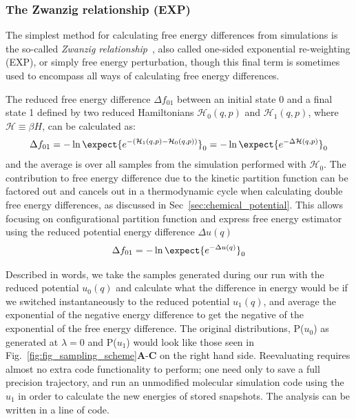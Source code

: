 \subsubsection{The Zwanzig relationship (EXP)}
The simplest method for calculating free energy differences from simulations is the so-called \textit{Zwanzig
relationship}~\cite{zwanzig1954hightemperature}, also called one-sided exponential re-weighting (EXP), or simply free energy perturbation, though this final term is sometimes used to encompass all ways of calculating free energy differences.

The reduced free energy difference $\Delta f_{01}$ between an initial state 0 and a final state 1 defined by two reduced Hamiltonians $\mathcal{H}_0(q,p)$ and $\mathcal{H}_1(q,p)$, where $\mathcal{H} \equiv \beta H$, can be calculated as:
\begin{eqnarray}
\Delta f_{01}  =  -\ln \expect{e^{- (\mathcal{H}_1(q,p) - \mathcal{H}_0(q,p))}}_0 =  -\ln \expect{e^{- \Delta \mathcal{H}(q,p)} }_0
\end{eqnarray}
and the average is over all samples from the simulation performed with $\mathcal{H}_0$.
The contribution to free energy difference due to the kinetic partition function can be factored out and cancels out in a thermodynamic cycle when calculating double free energy differences, as discussed in Sec~\ref{sec:chemical_potential}.
This allows focusing on configurational partition function and express free energy estimator using the reduced potential energy difference $\Delta u(q)$
\begin{eqnarray}\label{eqn.zwanzig_configurational}
\Delta f_{01}  =   -\ln \expect{e^{- \Delta u(q)} }_0
\end{eqnarray}

Described in words, we take the samples generated during our run with the reduced potential $u_0(q)$ and calculate what the difference in energy would be if we switched instantaneously to the reduced potential $u_1(q)$, and average the exponential of the negative energy difference to get the negative of the exponential of the free energy difference. The original distributions, P($u_0$) as generated at $\lambda=0$ and P($u_1$) would look like those seen in Fig.~\ref{fig:fig_sampling_scheme}\textbf{A}-\textbf{C} on the right hand side. Reevaluating requires almost no extra code functionality to perform; one need only to save a full precision trajectory, and run an unmodified molecular simulation code using the $u_1$ in order to calculate the new energies of stored snapshots. The analysis can be written in a line of code.


